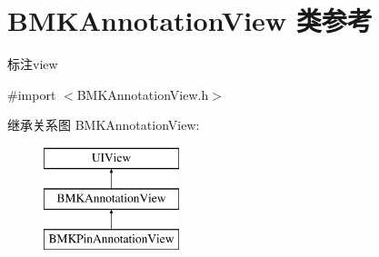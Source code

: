 \hypertarget{interface_b_m_k_annotation_view}{\section{B\-M\-K\-Annotation\-View 类参考}
\label{interface_b_m_k_annotation_view}
}


标注view  




{\ttfamily \#import $<$B\-M\-K\-Annotation\-View.\-h$>$}

继承关系图 B\-M\-K\-Annotation\-View\-:\begin{figure}[H]
\begin{center}
\leavevmode
\includegraphics[height=3.000000cm]{interface_b_m_k_annotation_view}
\end{center}
\end{figure}
